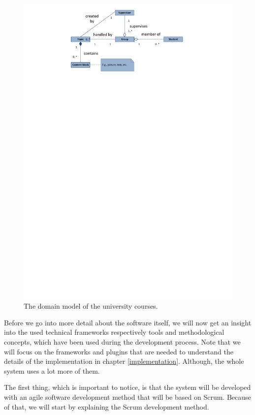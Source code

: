 \begin{figure}[th]
\centerline{\includegraphics[width=1\textwidth]{gfx/domainModel.pdf}}
\caption{The domain model of the university courses.}
\label{domain}
\end{figure}

Before we go into more detail about the software itself, we will now get an insight into the used technical frameworks respectively tools and methodological concepts, which have been used during the development process.  Note that we will focus on the frameworks and plugins that are needed to understand the details of the implementation in chapter \ref{implementation}. Although, the whole system uses a lot more of them.

The first thing, which is important to notice, is that the system will be developed with an agile software development method that will be based on Scrum. Because of that, we will start by explaining the Scrum development method.


